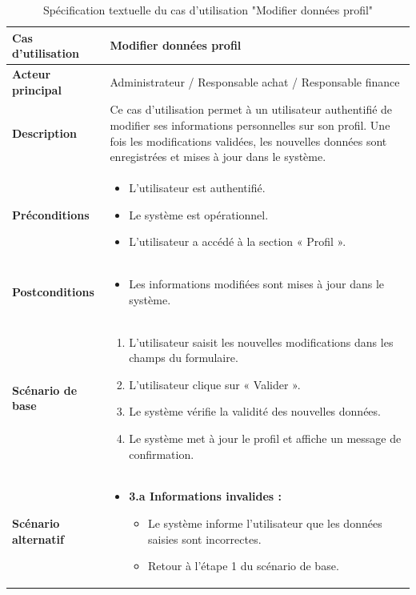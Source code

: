 \documentclass[a4paper,11pt]{report}
\begin{document}
\begin{table}[H]
  \centering
  \renewcommand{\arraystretch}{1.5}
  \caption{Spécification textuelle du cas d'utilisation "Modifier données profil"}
  \begin{tabularx}{\textwidth}{|l|X|}
    \hline
    \textbf{Cas d'utilisation} & Modifier données profil \\ \hline
    \textbf{Acteur principal}   & Administrateur / Responsable achat / Responsable finance \\ \hline
    \textbf{Description}        & Ce cas d'utilisation permet à un utilisateur authentifié de modifier ses informations personnelles sur son profil. Une fois les modifications validées, les nouvelles données sont enregistrées et mises à jour dans le système. \\ \hline
    \textbf{Préconditions}      &
    \begin{itemize}[leftmargin=*]
      \item L’utilisateur est authentifié.
      \item Le système est opérationnel.
      \item L’utilisateur a accédé à la section « Profil ».
    \end{itemize} \\ \hline
    \textbf{Postconditions}     &
    \begin{itemize}[leftmargin=*]
      \item Les informations modifiées sont mises à jour dans le système.
    \end{itemize} \\ \hline
    \textbf{Scénario de base}   &
    \begin{enumerate}[leftmargin=*]
      \item L’utilisateur saisit les nouvelles modifications dans les champs du formulaire.
      \item L’utilisateur clique sur « Valider ».
      \item Le système vérifie la validité des nouvelles données.
      \item Le système met à jour le profil et affiche un message de confirmation.
    \end{enumerate} \\ \hline
    \textbf{Scénario alternatif} &
    \begin{itemize}[leftmargin=*]
      \item \textbf{3.a Informations invalides :}
        \begin{itemize}[leftmargin=1em]
          \item Le système informe l’utilisateur que les données saisies sont incorrectes.
          \item Retour à l’étape 1 du scénario de base.
        \end{itemize}
    \end{itemize} \\ \hline
  \end{tabularx}
\end{table}
\end{document}
